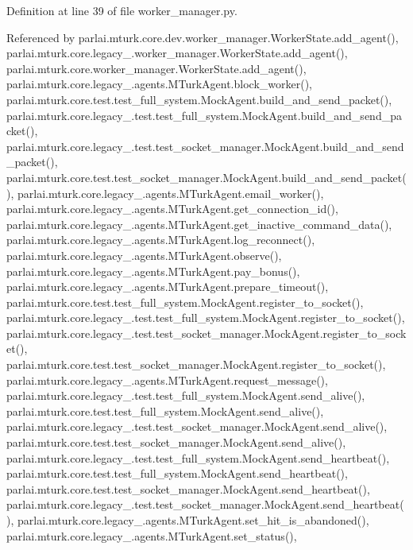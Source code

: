 Definition at line 39 of file worker\+\_\+manager.\+py.



Referenced by parlai.\+mturk.\+core.\+dev.\+worker\+\_\+manager.\+Worker\+State.\+add\+\_\+agent(), parlai.\+mturk.\+core.\+legacy\+\_.\+worker\+\_\+manager.\+Worker\+State.\+add\+\_\+agent(), parlai.\+mturk.\+core.\+worker\+\_\+manager.\+Worker\+State.\+add\+\_\+agent(), parlai.\+mturk.\+core.\+legacy\+\_.\+agents.\+M\+Turk\+Agent.\+block\+\_\+worker(), parlai.\+mturk.\+core.\+test.\+test\+\_\+full\+\_\+system.\+Mock\+Agent.\+build\+\_\+and\+\_\+send\+\_\+packet(), parlai.\+mturk.\+core.\+legacy\+\_.\+test.\+test\+\_\+full\+\_\+system.\+Mock\+Agent.\+build\+\_\+and\+\_\+send\+\_\+packet(), parlai.\+mturk.\+core.\+legacy\+\_.\+test.\+test\+\_\+socket\+\_\+manager.\+Mock\+Agent.\+build\+\_\+and\+\_\+send\+\_\+packet(), parlai.\+mturk.\+core.\+test.\+test\+\_\+socket\+\_\+manager.\+Mock\+Agent.\+build\+\_\+and\+\_\+send\+\_\+packet(), parlai.\+mturk.\+core.\+legacy\+\_.\+agents.\+M\+Turk\+Agent.\+email\+\_\+worker(), parlai.\+mturk.\+core.\+legacy\+\_.\+agents.\+M\+Turk\+Agent.\+get\+\_\+connection\+\_\+id(), parlai.\+mturk.\+core.\+legacy\+\_.\+agents.\+M\+Turk\+Agent.\+get\+\_\+inactive\+\_\+command\+\_\+data(), parlai.\+mturk.\+core.\+legacy\+\_.\+agents.\+M\+Turk\+Agent.\+log\+\_\+reconnect(), parlai.\+mturk.\+core.\+legacy\+\_.\+agents.\+M\+Turk\+Agent.\+observe(), parlai.\+mturk.\+core.\+legacy\+\_.\+agents.\+M\+Turk\+Agent.\+pay\+\_\+bonus(), parlai.\+mturk.\+core.\+legacy\+\_.\+agents.\+M\+Turk\+Agent.\+prepare\+\_\+timeout(), parlai.\+mturk.\+core.\+test.\+test\+\_\+full\+\_\+system.\+Mock\+Agent.\+register\+\_\+to\+\_\+socket(), parlai.\+mturk.\+core.\+legacy\+\_.\+test.\+test\+\_\+full\+\_\+system.\+Mock\+Agent.\+register\+\_\+to\+\_\+socket(), parlai.\+mturk.\+core.\+legacy\+\_.\+test.\+test\+\_\+socket\+\_\+manager.\+Mock\+Agent.\+register\+\_\+to\+\_\+socket(), parlai.\+mturk.\+core.\+test.\+test\+\_\+socket\+\_\+manager.\+Mock\+Agent.\+register\+\_\+to\+\_\+socket(), parlai.\+mturk.\+core.\+legacy\+\_.\+agents.\+M\+Turk\+Agent.\+request\+\_\+message(), parlai.\+mturk.\+core.\+legacy\+\_.\+test.\+test\+\_\+full\+\_\+system.\+Mock\+Agent.\+send\+\_\+alive(), parlai.\+mturk.\+core.\+test.\+test\+\_\+full\+\_\+system.\+Mock\+Agent.\+send\+\_\+alive(), parlai.\+mturk.\+core.\+legacy\+\_.\+test.\+test\+\_\+socket\+\_\+manager.\+Mock\+Agent.\+send\+\_\+alive(), parlai.\+mturk.\+core.\+test.\+test\+\_\+socket\+\_\+manager.\+Mock\+Agent.\+send\+\_\+alive(), parlai.\+mturk.\+core.\+legacy\+\_.\+test.\+test\+\_\+full\+\_\+system.\+Mock\+Agent.\+send\+\_\+heartbeat(), parlai.\+mturk.\+core.\+test.\+test\+\_\+full\+\_\+system.\+Mock\+Agent.\+send\+\_\+heartbeat(), parlai.\+mturk.\+core.\+test.\+test\+\_\+socket\+\_\+manager.\+Mock\+Agent.\+send\+\_\+heartbeat(), parlai.\+mturk.\+core.\+legacy\+\_.\+test.\+test\+\_\+socket\+\_\+manager.\+Mock\+Agent.\+send\+\_\+heartbeat(), parlai.\+mturk.\+core.\+legacy\+\_.\+agents.\+M\+Turk\+Agent.\+set\+\_\+hit\+\_\+is\+\_\+abandoned(), parlai.\+mturk.\+core.\+legacy\+\_.\+agents.\+M\+Turk\+Agent.\+set\+\_\+status(), 